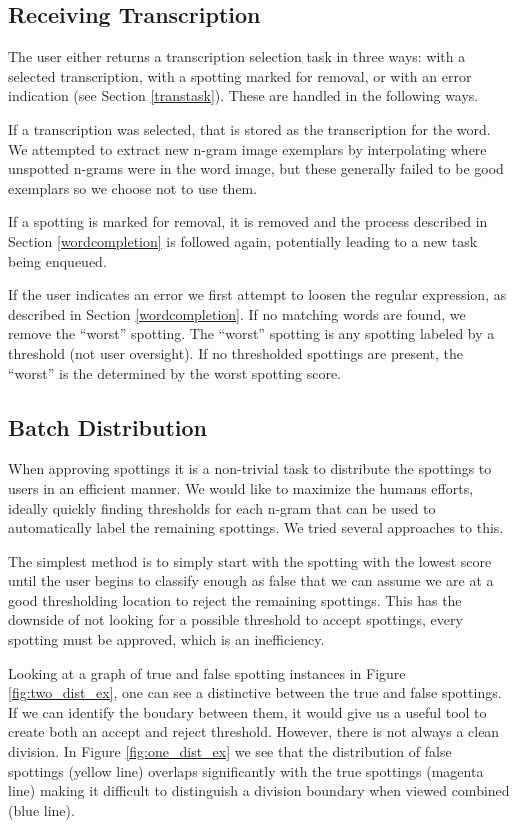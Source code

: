\documentclass[ms,electronic,twosidetoc,letterpaper,chaptercenter,parttop,lof,lot]{byumsphd}
\begin{document}
\subsection{Receiving Transcription}
The user either returns a transcription selection task in three ways: with a selected transcription, with a spotting marked for removal, or with an error indication (see Section \ref{transtask}). These are handled in the following ways.

If a transcription was selected, that is stored as the transcription for the word. We attempted to extract new n-gram image exemplars by interpolating where unspotted n-grams were in the word image, but these generally failed to be good exemplars so we choose not to use them.

If a spotting is marked for removal, it is removed and the process described in Section \ref{wordcompletion} is followed again, potentially leading to a new task being enqueued.

If the user indicates an error we first attempt to loosen the regular expression, as described in Section \ref{wordcompletion}. If no matching words are found, we remove the ``worst'' spotting. The ``worst'' spotting is any spotting labeled by a threshold (not user oversight). If no thresholded spottings are present, the ``worst'' is the determined by the worst spotting score.


\subsection{Batch Distribution}
When approving spottings it is a non-trivial task to distribute the spottings to users in an efficient manner. We would like to maximize the humans efforts, ideally quickly finding thresholds for each n-gram that can be used to automatically label the remaining spottings. We tried several approaches to this.

The simplest method is to simply start with the spotting with the lowest score until the user begins to classify enough as false that  we can assume we are at a good thresholding location to reject the remaining spottings. 
This has the downside of not looking for a possible threshold to accept spottings, every spotting must be approved, which is an inefficiency.


Looking at a graph of true and false spotting instances in Figure \ref{fig:two_dist_ex}, one can see a distinctive between the true and false spottings. If we can identify the boudary between them, it would give us a useful tool to create both an accept and reject threshold. However, there is not always a clean division. In Figure \ref{fig:one_dist_ex} we see that the distribution of false spottings (yellow line) overlaps significantly with the true spottings (magenta line) making it difficult to distinguish a division boundary when viewed combined (blue line).
\end{document}
